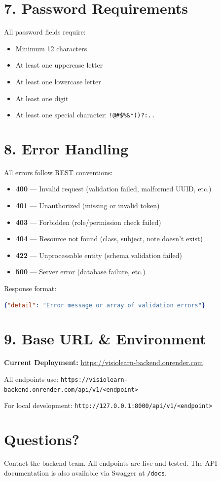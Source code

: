\documentclass[11pt,a4paper]{article}
\begin{document}
\section*{7. Password Requirements}

All password fields require:
\begin{itemize}
    \item Minimum 12 characters
    \item At least one uppercase letter
    \item At least one lowercase letter
    \item At least one digit
    \item At least one special character: \texttt{!@\#\$\%\&*()?:..}
\end{itemize}

\section*{8. Error Handling}

All errors follow REST conventions:
\begin{itemize}
    \item \textbf{400} — Invalid request (validation failed, malformed UUID, etc.)
    \item \textbf{401} — Unauthorized (missing or invalid token)
    \item \textbf{403} — Forbidden (role/permission check failed)
    \item \textbf{404} — Resource not found (class, subject, note doesn't exist)
    \item \textbf{422} — Unprocessable entity (schema validation failed)
    \item \textbf{500} — Server error (database failure, etc.)
\end{itemize}

Response format:
\begin{lstlisting}[language=json]
{"detail": "Error message or array of validation errors"}
\end{lstlisting}

\section*{9. Base URL \& Environment}

\textbf{Current Deployment:} \url{https://visiolearn-backend.onrender.com}

All endpoints use: \texttt{https://visiolearn-backend.onrender.com/api/v1/<endpoint>}

For local development: \texttt{http://127.0.0.1:8000/api/v1/<endpoint>}

\section*{Questions?}

Contact the backend team. All endpoints are live and tested. The API documentation is also available via Swagger at \texttt{/docs}.
\end{document}
